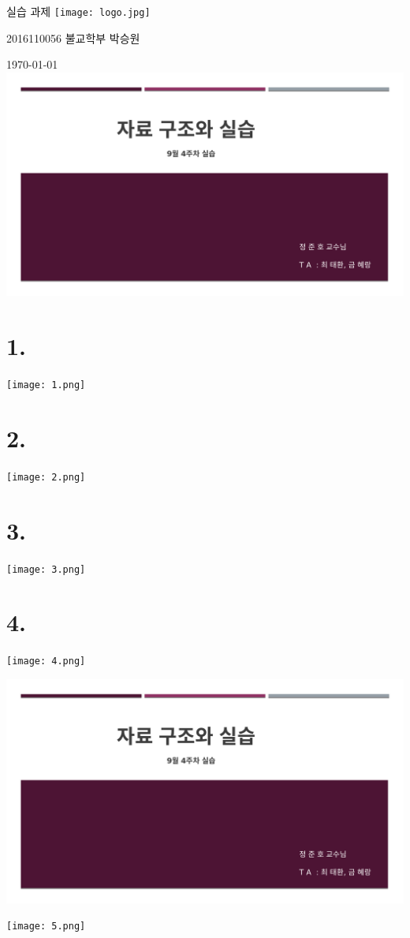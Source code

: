 \documentclass[11pt,a4paper]{article}
\begin{document}
{\Huge{} 실습 과제 \texttt{[image: logo.jpg]}}

\hfill2016110056 불교학부 박승원

\hfill\today
\noindent
\lstset{language=C, tabsize=4, frame=single, showstringspaces=false, breaklines=true}
\includegraphics[page=2, width=\textwidth]{1.pdf}
\section*{1.}
	
\texttt{[image: 1.png]}	


\section*{2.}	
	
\texttt{[image: 2.png]}	


\section*{3.}
	
\texttt{[image: 3.png]}	


\section*{4.}
	
\texttt{[image: 4.png]}	


\includegraphics[page=3, width=\textwidth]{1.pdf}
	
\texttt{[image: 5.png]}	
\end{document}
